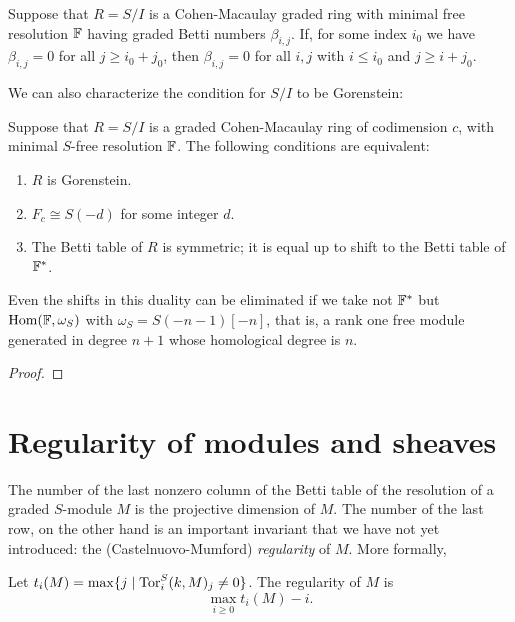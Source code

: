 \begin{corollary}\label{dual zero restrictions}
 Suppose that $R = S/I$ is a Cohen-Macaulay graded ring with minimal free resolution ${\mathbb F}$ having
 graded Betti numbers
 $\beta_{i,j}$. If, for some index $i_{0}$ we have $\beta_{i,j} = 0$ for all $j\geq i_{0}+j_{0}$, then
 $\beta_{i,j} = 0$ for all $i,j$ with $i\leq i_{0}$ and $j\geq i+j_{0}$. 
 \end{corollary}

We can also characterize the condition for $S/I$ to be Gorenstein:

\begin{proposition}\label{Gorenstein characterization}
Suppose that $R = S/I$ is a graded Cohen-Macaulay ring of codimension $c$, with minimal $S$-free resolution 
${\mathbb F}$. The following conditions are equivalent:
\begin{enumerate}
 \item $R$ is Gorenstein.
 \item $F_{c} \cong S(-d)$ for some integer $d$.
 \item The Betti table of $R$ is symmetric; it is equal up to shift to the Betti table of ${\mathbb F}^{*}$.
\end{enumerate}
\end{proposition}

Even the shifts in this duality can be eliminated if we take not ${\mathbb F}^{*}$ but $\operatorname{Hom}({\mathbb F}, \omega_{S})$ 
with $\omega_{S} = S(-n-1)[-n]$, that is, a rank one free module generated in degree $n+1$ whose
homological degree is $n$.

\begin{proof}
 
\end{proof}

\section{Regularity of modules and sheaves}
The number of the last nonzero column of the Betti table of the resolution of a graded $S$-module $M$ is the projective dimension of $M$. The number of the last row, on the other hand is an important invariant that we have not
yet introduced: the (Castelnuovo-Mumford) \emph {regularity} of $M$. More formally,
\begin{definition}
Let $t_{i}(M) = \max \{j \mid \operatorname{Tor}^{S}_{i}(k,M)_{j} \neq 0\}$. The regularity of $M$ is
$$
\max_{i \geq 0} t_{i}(M)-i.
$$
\end{definition}

